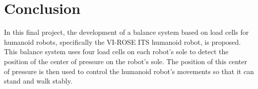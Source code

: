 \section{Conclusion}
\label{sec:conclusion}

In this final project, the development of a balance system based on load cells for humanoid robots, specifically the VI-ROSE ITS humanoid robot, is proposed. This balance system uses four load cells on each robot's sole to detect the position of the center of pressure on the robot's sole. The position of this center of pressure is then used to control the humanoid robot's movements so that it can stand and walk stably.
